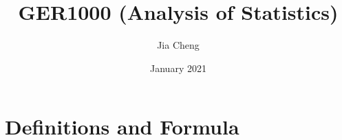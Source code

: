 \documentclass{article}
\title{GER1000 (Analysis of Statistics)}
\author{Jia Cheng}
\date{January 2021}
\begin{document}
\maketitle

\section{Definitions and Formula}

\section{}
\end{document}
